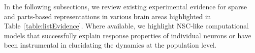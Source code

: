 In the following subsections,
we review existing experimental evidence
for sparse and parts-based representations 
in various brain areas highlighted in Table~\ref{table:listEvidence}.
Where available, we highlight \ac{NSC}-like computational models
that  successfully explain response properties of individual neurons
or have been instrumental in elucidating the dynamics at the population level.

